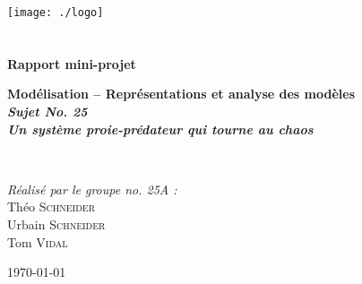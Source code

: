 \begin{titlepage}
\begin{center}

\texttt{[image: ./logo]}~\\[1cm]


\textsc{\Large }\\[0.5cm]

\HRule \\[0.4cm]

{\huge \bfseries Rapport mini-projet\\
[0.4cm] }

{\large \bfseries Modélisation -- Représentations et analyse des modèles\\[0.4cm] }
{\large \bfseries \textit{Sujet No. 25}\\ }
{\large \bfseries \textit{Un système proie-prédateur qui tourne au chaos}\\[0.4cm] }


\HRule \\[1.5cm]

\vspace{3cm}

\begin{minipage}{0.4\textwidth}
\begin{flushleft} \large
\emph{Réalisé par le groupe no. 25A :}\\
	Théo \textsc{Schneider} \\
	Urbain \textsc{Schneider} \\
	Tom \textsc{Vidal}
\end{flushleft}

\end{minipage}


\vfill

{\large \today}

\end{center}
\end{titlepage}